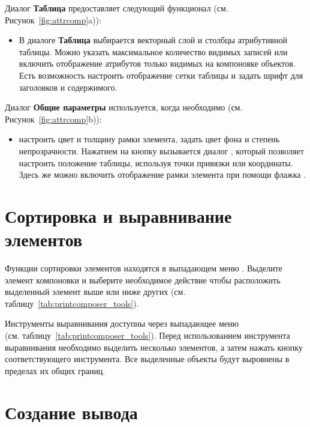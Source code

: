 
Диалог \textbf{Таблица} предоставляет следующий функционал
(см. Рисунок~\ref{fig:attrcomp}a)):

\begin{itemize}[label=--]
\item В диалоге \textbf{Таблица} выбирается векторный слой и столбцы
атрибутивной таблицы. Можно указать максимальное количество видимых
записей или включить отображение атрибутов только видимых на компоновке
объектов. Есть возможность настроить отображение сетки таблицы и задать
шрифт для заголовков и содержимого.
\end{itemize}


Диалог \textbf{Общие параметры} используется, когда необходимо
(см. Рисунок~\ref{fig:attrcomp}b)):

\begin{itemize}[label=--]
\item настроить цвет и толщину рамки элемента, задать
цвет фона и степень непрозрачности. Нажатием на кнопку 
вызывается диалог , который позволяет
настроить положение таблицы, используя точки привязки или координаты.
Здесь же можно включить отображение рамки элемента при помощи флажка
.
\end{itemize}

\section{Сортировка и выравнивание элементов}

Функции сортировки элементов находятся в выпадающем меню
. Выделите
элемент компоновки и выберите необходимое действие чтобы расположить
выделенный элемент выше или ниже других (см. таблицу~\ref{tab:printcomposer_tools}).

Инструменты выравнивания доступны через выпадающее меню \\
(см. таблицу~\ref{tab:printcomposer_tools}). Перед использованием
инструмента выравнивания необходимо выделить несколько элементов, а
затем нажать кнопку соответствующего инструмента. Все выделенные объекты
будут выровнены в пределах их общих границ.

\section{Создание вывода}

